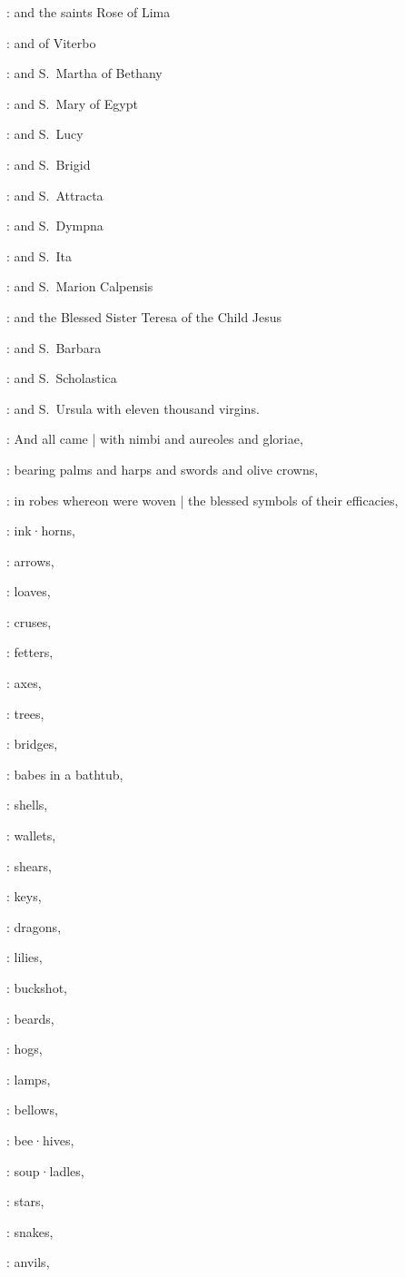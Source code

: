 :
and the saints Rose of Lima

:
and of Viterbo

:
and S.~Martha of Bethany

:
and S.~Mary of Egypt

:
and S.~Lucy

:
and S.~Brigid

:
and S.~Attracta

:
and S.~Dympna

:
and S.~Ita

:
and S.~Marion Calpensis

:
and the Blessed Sister Teresa of the Child Jesus

:
and S.~Barbara

:
and S.~Scholastica

:
and S.~Ursula with eleven thousand virgins.

:
And all came |
with nimbi and aureoles and gloriae,

:
bearing palms and harps and swords and olive crowns,

:
in robes whereon were woven |
the blessed symbols of their efficacies,

:
ink·horns,

:
arrows,

:
loaves,

:
cruses,

:
fetters,

:
axes,

:
trees,

:
bridges,

:
babes in a bathtub,

:
shells,

:
wallets,

:
shears,

:
keys,

:
dragons,

:
lilies,

:
buckshot,

:
beards,

:
hogs,

:
lamps,

:
bellows,

:
bee·hives,

:
soup·ladles,

:
stars,

:
snakes,

:
anvils,

